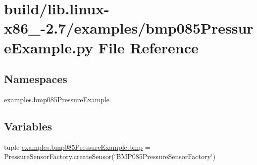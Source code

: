 \hypertarget{build_2lib_8linux-x86__64-2_87_2examples_2bmp085PressureExample_8py}{}\section{build/lib.linux-\/x86\+\_-\/2.7/examples/bmp085\+Pressure\+Example.py File Reference}
\label{build_2lib_8linux-x86__64-2_87_2examples_2bmp085PressureExample_8py}
\subsection*{Namespaces}
\begin{DoxyCompactItemize}
\item 
 \hyperlink{namespaceexamples_1_1bmp085PressureExample}{examples.\+bmp085\+Pressure\+Example}
\end{DoxyCompactItemize}
\subsection*{Variables}
\begin{DoxyCompactItemize}
\item 
tuple \hyperlink{namespaceexamples_1_1bmp085PressureExample_a8dc596a71ce8777d7f85c8909efec6a4}{examples.\+bmp085\+Pressure\+Example.\+bmp} = Pressure\+Sensor\+Factory.\+create\+Sensor(\char`\"{}B\+M\+P085\+Pressure\+Sensor\+Factory\char`\"{})
\end{DoxyCompactItemize}
